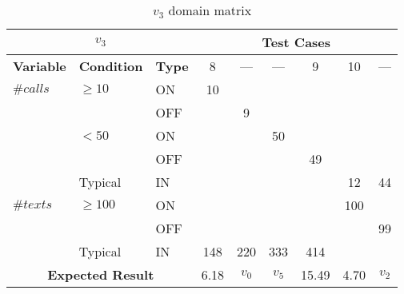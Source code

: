 %
  {\protect\numberline{}}
\begin{table}[!htbp]
  \centering
  \begin{tabular}{|*{3}{l|}*{6}{c|}}
    \hline
    \multicolumn{3}{|c|}{$v_3$}
    & \multicolumn{6}{|c|}{\textbf{Test Cases}} \\ \hline
    \textbf{Variable} & \textbf{Condition} & \textbf{Type}
                                &  8   &  ---  &  ---  &   9   &  10  &  ---  \\ \hline
    $\#calls$ & $\ge 10$  & ON  &  10  &       &       &       &      &       \\ \cline{3-9}
              &           & OFF &      &   9   &       &       &      &       \\ \cline{2-9}
              & $< 50$    & ON  &      &       &  50   &       &      &       \\ \cline{3-9}
              &           & OFF &      &       &       &  49   &      &       \\ \cline{2-9}
              & Typical   & IN  &      &       &       &       &  12  &  44   \\ \hline
    $\#texts$ & $\ge 100$ & ON  &      &       &       &       & 100  &       \\ \cline{3-9}
              &           & OFF &      &       &       &       &      &  99   \\ \cline{2-9}
              & Typical   & IN  & 148  &  220  &  333  &  414  &      &       \\ \hline
    \multicolumn{3}{|c|}{\textbf{Expected Result}}
                                & 6.18 & $v_0$ & $v_5$ & 15.49 & 4.70 & $v_2$ \\ \hline
  \end{tabular}
  \caption{$v_3$ domain matrix}
  \label{tab:methods.computeBill.matrices.v3}
\end{table}
\clearpage


